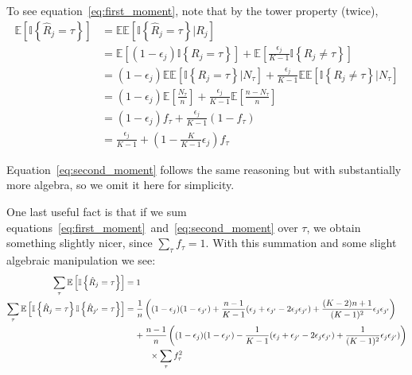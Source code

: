 \documentclass[letterpaper,fontsize=9pt,DIV=12]{scrartcl}
\begin{document}
To see equation~\eqref{eq:first_moment}, note that by the tower property (twice),
\begin{align*}
\mathbb{E}\left[\mathbb{I}\left\{\hat{R}_j = \tau\right\}\right] &= \mathbb{E}\mathbb{E}\left[\mathbb{I}\left\{\hat{R}_j = \tau\right\} | R_j\right]\\
&= \mathbb{E}\left[(1-\epsilon_j) \mathbb{I}\left\{R_j = \tau \right\}\right] + \mathbb{E}\left[\frac{\epsilon_j}{K-1}\mathbb{I}\left\{R_j \ne \tau \right\}\right]\\
&= (1-\epsilon_j)\mathbb{E}\mathbb{E}\left[\mathbb{I}\left\{R_j = \tau \right\} | N_\tau \right] + \frac{\epsilon_j}{K-1}\mathbb{E}\mathbb{E}\left[\mathbb{I}\left\{R_j \ne \tau \right\} | N_\tau \right]\\
&= (1-\epsilon_j) \mathbb{E}\left[\frac{N_\tau}{n}\right] + \frac{\epsilon_j}{K-1}\mathbb{E}\left[\frac{n-N_\tau}{n}\right]\\
&= (1-\epsilon_j) f_\tau + \frac{\epsilon_j}{K-1}(1- f_\tau)\\
&= \frac{\epsilon_j}{K-1} + \left(1 - \frac{K}{K-1}\epsilon_j\right)f_\tau
\end{align*}

Equation~\eqref{eq:second_moment} follows the same reasoning but with substantially more algebra, so we omit it here for simplicity.

One last useful fact is that if we sum equations~\eqref{eq:first_moment}~and~\eqref{eq:second_moment} over $\tau$, we obtain something slightly nicer, since $\sum_\tau f_\tau =1$.  With this summation and some slight algebraic manipulation we see:
\begin{align}
\sum_{\tau}\mathbb{E}\left[\mathbb{I}\left\{\hat{R}_j = \tau\right\}\right] &= 1 \label{eq:first_moment_sum}\\
\sum_{\tau}\mathbb{E}\left[\mathbb{I}\left\{\hat{R}_j = \tau\right\}\mathbb{I}\left\{\hat{R}_{j'} = \tau\right\}\right] &= \frac{1}{n}\left((1-\epsilon_j)(1-\epsilon_{j'}) + \frac{n-1}{K-1}(\epsilon_j + \epsilon_{j'} - 2\epsilon_j\epsilon_{j'}) + \frac{(K-2)n + 1}{(K-1)^2}\epsilon_j\epsilon_{j'}\right)  \label{eq:second_moment_sum} \\&\hspace{0.4cm}+ \frac{n-1}{n}\left((1-\epsilon_j)(1-\epsilon_{j'}) - \frac{1}{K-1}(\epsilon_j + \epsilon_{j'} - 2\epsilon_j\epsilon_{j'}) + \frac{1}{(K-1)^2}\epsilon_j\epsilon_{j'})\right)  \nonumber \\ &\hspace{1cm}\times \sum_\tau f_\tau^2 \nonumber
\end{align}
\end{document}
